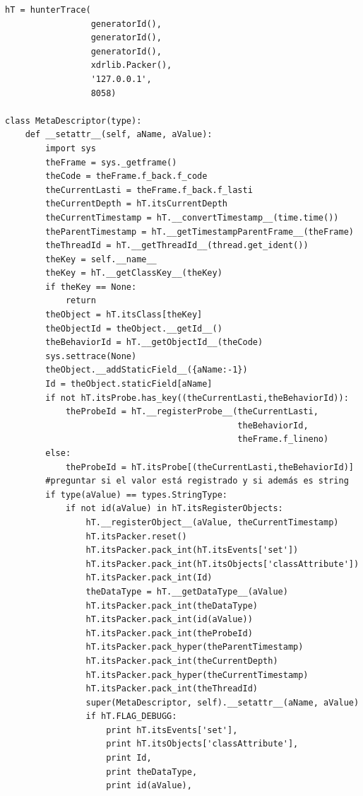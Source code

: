 \documentclass[12pt,legalpaper]{report}
\begin{document}
\begin{singlespace}
\begin{lstlisting}[style=Python]
hT = hunterTrace(
                 generatorId(),
                 generatorId(),
                 generatorId(),
                 xdrlib.Packer(),
                 '127.0.0.1',
                 8058)

class MetaDescriptor(type):
    def __setattr__(self, aName, aValue):
        import sys
        theFrame = sys._getframe()
        theCode = theFrame.f_back.f_code
        theCurrentLasti = theFrame.f_back.f_lasti
        theCurrentDepth = hT.itsCurrentDepth
        theCurrentTimestamp = hT.__convertTimestamp__(time.time())
        theParentTimestamp = hT.__getTimestampParentFrame__(theFrame)
        theThreadId = hT.__getThreadId__(thread.get_ident())
        theKey = self.__name__
        theKey = hT.__getClassKey__(theKey)
        if theKey == None:
            return
        theObject = hT.itsClass[theKey]
        theObjectId = theObject.__getId__()
        theBehaviorId = hT.__getObjectId__(theCode)
        sys.settrace(None)
        theObject.__addStaticField__({aName:-1})
        Id = theObject.staticField[aName]
        if not hT.itsProbe.has_key((theCurrentLasti,theBehaviorId)):
            theProbeId = hT.__registerProbe__(theCurrentLasti,
                                              theBehaviorId,
                                              theFrame.f_lineno)
        else:
            theProbeId = hT.itsProbe[(theCurrentLasti,theBehaviorId)]          
        #preguntar si el valor está registrado y si además es string
        if type(aValue) == types.StringType:
            if not id(aValue) in hT.itsRegisterObjects:
                hT.__registerObject__(aValue, theCurrentTimestamp)
                hT.itsPacker.reset()
                hT.itsPacker.pack_int(hT.itsEvents['set'])
                hT.itsPacker.pack_int(hT.itsObjects['classAttribute'])
                hT.itsPacker.pack_int(Id)
                theDataType = hT.__getDataType__(aValue)
                hT.itsPacker.pack_int(theDataType)
                hT.itsPacker.pack_int(id(aValue))
                hT.itsPacker.pack_int(theProbeId)
                hT.itsPacker.pack_hyper(theParentTimestamp)        
                hT.itsPacker.pack_int(theCurrentDepth)
                hT.itsPacker.pack_hyper(theCurrentTimestamp)
                hT.itsPacker.pack_int(theThreadId)
                super(MetaDescriptor, self).__setattr__(aName, aValue)
                if hT.FLAG_DEBUGG:
                    print hT.itsEvents['set'],
                    print hT.itsObjects['classAttribute'],
                    print Id,
                    print theDataType,
                    print id(aValue),

\end{lstlisting}
\end{singlespace}
\end{document}
